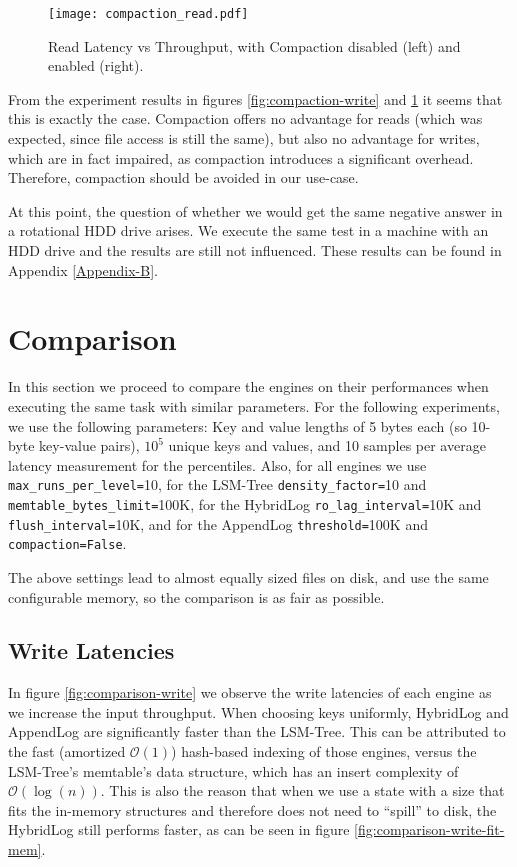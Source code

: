 \begin{figure}[h]
    \centering
    \texttt{[image: compaction\_read.pdf]}
    \caption{Read Latency vs Throughput, with Compaction disabled (left) and enabled (right).}
    \label{fig:compaction_read}
\end{figure}

From the experiment results in figures \ref{fig:compaction-write} and \ref{fig:compaction_read} it seems that this is exactly the case. Compaction offers no advantage for reads (which was expected, since file access is still the same), but also no advantage for writes, which are in fact impaired, as compaction introduces a significant overhead. Therefore, compaction should be avoided in our use-case.

At this point, the question of whether we would get the same negative answer in a rotational HDD drive arises. We execute the same test in a machine with an HDD drive and the results are still not influenced. These results can be found in Appendix \ref{Appendix-B}.

\section{Comparison}

In this section we proceed to compare the engines on their performances when executing the same task with similar parameters. For the following experiments, we use the following parameters: Key and value lengths of 5 bytes each (so 10-byte key-value pairs), $10^5$ unique keys and values, and 10 samples per average latency measurement for the percentiles. Also, for all engines we use \verb"max_runs_per_level="10, for the LSM-Tree \verb"density_factor="10 and \verb"memtable_bytes_limit="100K, for the HybridLog \verb"ro_lag_interval="10K and \verb"flush_interval="10K, and for the AppendLog \verb"threshold="100K and \verb|compaction=False|.

The above settings lead to almost equally sized files on disk, and use the same configurable memory, so the comparison is as fair as possible.

\subsection{Write Latencies}

In figure \ref{fig:comparison-write} we observe the write latencies of each engine as we increase the input throughput. When choosing keys uniformly, HybridLog and AppendLog are significantly faster than the LSM-Tree. This can be attributed to the fast (amortized $\mathcal{O}(1)$) hash-based indexing of those engines, versus the LSM-Tree's memtable's data structure, which has an insert complexity of $\mathcal{O}(\log{}(n))$. This is also the reason that when we use a state with a size that fits the in-memory structures and therefore does not need to ``spill'' to disk, the HybridLog still performs faster, as can be seen in figure \ref{fig:comparison-write-fit-mem}.

